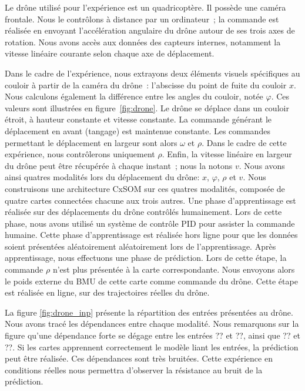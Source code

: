 \documentclass[../main]{subfiles}
\begin{document}
Le drône utilisé pour l'expérience est un quadricoptère. Il possède une caméra frontale.
Nous le contrôlons à distance par un ordinateur~; la commande est réalisée en envoyant l'accélération angulaire du drône autour de ses trois axes de rotation.
Nous avons accès aux données des capteurs internes, notamment la vitesse linéaire courante selon chaque axe de déplacement.

Dans le cadre de l'expérience, nous extrayons deux éléments visuels spécifiques au couloir à partir de la caméra du drône~: l'abscisse du point de fuite du couloir $x$. Nous calculons également la différence entre les angles du couloir, notée $\varphi$. Ces valeurs sont illustrées en figure~\ref{fig:drone}.
Le drône se déplace dans un couloir étroit, à hauteur constante et vitesse constante.
La commande générant le déplacement en avant (tangage) est maintenue constante. Les commandes permettant le déplacement en largeur sont alors $\omega$ et $\rho$. Dans le cadre de cette expérience, nous contrôlerons uniquement $\rho$.
Enfin, la vitesse linéaire en largeur du drône peut être récupérée à chaque instant~; nous la notons $v$.
Nous avons ainsi quatres modalités lors du déplacement du drône: $x$, $\varphi$, $\rho$ et $v$.
Nous construisons une architecture CxSOM sur ces quatres modalités, composée de quatre cartes connectées chacune aux trois autres.
Une phase d'apprentissage est réalisée sur des déplacements du drône contrôlés humainement. Lors de cette phase, nous avons utilisé un système de contrôle PID pour assister la commande humaine. 
Cette phase d'apprentissage est réalisée hors ligne pour que les données soient présentées aléatoirement aléatoirement lors de l'apprentissage.
Après apprentissage, nous effectuons une phase de prédiction. Lors de cette étape, la commande $\rho$ n'est plus présentée à la carte correspondante. Nous envoyons alors le poids externe du BMU de cette carte comme commande du drône. Cette étape est réalisée en ligne, sur des trajectoires réelles du drône.

La figure \ref{fig:drone_inp} présente la répartition des entrées présentées au drône. Nous avons tracé les dépendances entre chaque modalité. Nous remarquons sur la figure qu'une dépendance forte se dégage entre les entrées ?? et ??, ainsi que ?? et ??. Si les cartes apprennent correctement le modèle liant les entrées, la prédiction peut être réalisée.
Ces dépendances sont très bruitées. Cette expérience en conditions réelles nous permettra d'observer la résistance au bruit de la prédiction.
\end{document}
